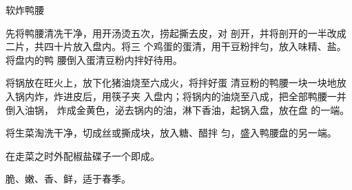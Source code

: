 \begin{recipe}{软炸鸭腰}

\ingredients


\cooking

\step 先将鸭腰清冼干净，用开汤烫五次，捞起撕去皮，对 剖开，并将剖开的一半改成二片，共四十片放入盘内。将三 个鸡蛋的蛋清，用干豆粉拌匀，放入味精、盐。将盘内的鸭 腰倒入蛋清豆粉内拌好待用。

\step 将锅放在旺火上，放下化猪油烧至六成火，将拌好蛋 清豆粉的鸭腰一块一块地放入锅内炸，炸进皮后，用筷子夹 入盘内；将锅内的油烧至八成，把全部鸭腰一并倒入油锅， 炸成金黄色，泌去锅内的油，淋下香油，起锅入盘，放在盘 的一端。

\step 将生菜淘洗干净，切成丝或撕成块，放入糖、醋拌 匀，盛入鸭腰盘的另一端。

\step 在走菜之时外配椒盐碟子一个即成。

\notes

脆、嫩、香、鲜，适于春季。

\end{recipe}

